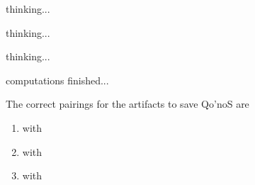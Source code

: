 \documentclass[white]{guildcamp3}
\begin{document}
\name{\wEndWorldSix{}} %

thinking...

thinking...

thinking...

computations finished...

The correct pairings for the artifacts to save Qo'noS are

\begin{enumerate}
	\item \iMagicArtifactThree{} with \iTechArtifactTwo{}

	\item \iMagicArtifactTwo{} with \iTechArtifactThree{}

	\item \iMagicArtifactOne{} with \iTechArtifactOne{}
\end{enumerate}

\end{document}
